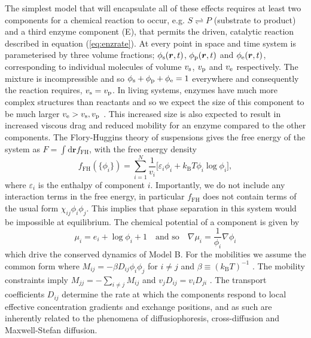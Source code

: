The simplest model that will encapsulate all of these effects requires at least two components for a chemical reaction to occur, e.g. $S \rightleftharpoons P$ (substrate to product) and a third enzyme component (E), that permits the driven, catalytic reaction described in equation (\ref{eq:enzrate}). At every point in space and time system is parameterised by three volume fractions; $\phi_{\mathrm{s}}(\bm{r},t)$, $\phi_{\mathrm{p}}(\bm{r},t)$ and $\phi_{\mathrm{e}}(\bm{r},t)$, corresponding to individual molecules of volume $v_{\mathrm{s}}$, $v_{\mathrm{p}}$ and $v_{\mathrm{e}}$ respectively. The mixture is incompressible and so $\phi_{\mathrm{s}}+\phi_{\mathrm{p}}+\phi_{\mathrm{e}}=1$ everywhere and consequently the reaction requires, $v_{\mathrm{s}} = v_{\mathrm{p}}$. In living systems, enzymes have much more complex structures than reactants and so we expect the size of this component to be much larger $v_{\mathrm{e}} > v_{\mathrm{s}}, v_{\mathrm{p}}$ \cite{berg_biochemistry_2002}. This increased size is also expected to result in increased viscous drag and reduced mobility for an enzyme compared to the other components. The Flory-Huggins theory of suspensions gives the free energy of the system as $F = \int \mathrm{d}\bm{r} f_\mathrm{FH}$, with the free energy density
\begin{equation}
    f_\mathrm{FH}(\{\phi_i\}) = \sum_{i=1}^{N} \frac{1}{v_i} \big[\varepsilon_i\phi_i + k_\mathrm{B}T \phi_i \log\phi_i \big], 
    \label{eq:fh_gen}
\end{equation}
where $\varepsilon_i$ is the enthalpy of component $i$. Importantly, we do not include any interaction terms in the free energy, in particular $f_\mathrm{FH}$ does not contain terms of the usual form $\chi_{ij}\phi_i \phi_j$. This implies that phase separation in this system would be impossible at equilibrium. The chemical potential of a component is given by
\begin{equation}
    \mu_i = e_i + \log\phi_i + 1 \quad \text{and so} \quad \nabla\mu_i = \frac{1}{\phi_i}\nabla\phi_i
    \label{eq:chempot}
\end{equation}
which drive the conserved dynamics of Model B. For the mobilities we assume the common form where $M_{ij} = -\beta D_{ij}\phi_i\phi_j$ for $i \neq j$ and $\beta \equiv (k_\mathrm{B}T)^{-1}$ \cite{KRAMER1984473}. The mobility constraints imply $M_{jj}= - \sum_{i\neq j} M_{ij}$ and $v_j D_{ij} = v_i D_{ji}$ \cite{kehr_mobility_1989, mao_designing_2020, bo_stochastic_2021}. The transport coefficients $D_{ij}$ determine the rate at which the components respond to local effective concentration gradients and exchange positions, and as such are inherently related to the phenomena of diffusiophoresis, cross-diffusion and Maxwell-Stefan diffusion.

